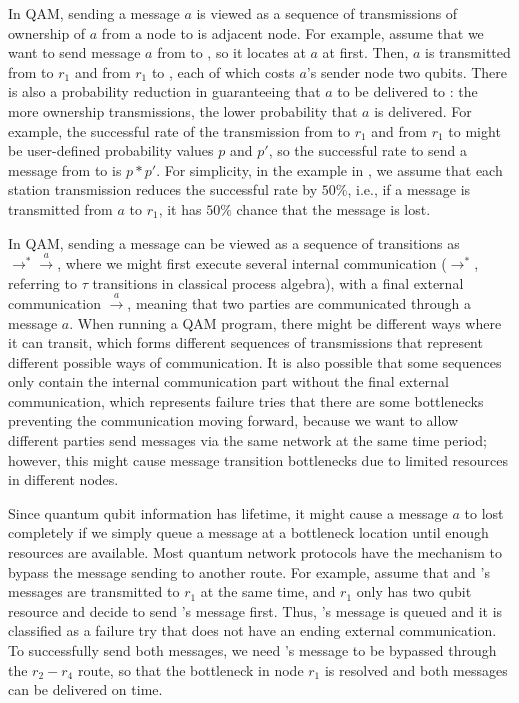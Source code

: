 In QAM, sending a message $a$ is viewed as a sequence of transmissions of ownership of $a$ from a node to is adjacent node.
For example, assume that we want to send message $a$ from  to , so it locates at $a$ at first.
Then, $a$ is transmitted from  to $r_1$ and from $r_1$ to , each of which costs $a$'s sender node two qubits.
There is also a probability reduction in guaranteeing that $a$ to be delivered to :
the more ownership transmissions, the lower probability that $a$ is delivered.
For example, the successful rate of the transmission from  to $r_1$ and from $r_1$ to  might be user-defined probability values $p$ and $p'$, so the successful rate to send a message from  to  is $p * p'$.
For simplicity, in the example in , we assume that each station transmission reduces the successful rate by $50\%$,
i.e., if a message is transmitted from $a$ to $r_1$, it has $50\%$ chance that the message is lost.

In QAM, sending a message can be viewed as a sequence of transitions as $\to^{*}\xrightarrow{a}$,
where we might first execute several internal communication ($\to^{*}$, referring to $\tau$ transitions in classical process algebra),
with a final external communication $\xrightarrow{a}$, meaning that two parties are communicated through a message $a$.
When running a QAM program, there might be different ways where it can transit, which forms different sequences of transmissions that represent different possible ways of communication. It is also possible that some sequences only contain the internal communication part without the final external communication, which represents failure tries that there are some bottlenecks preventing the communication moving forward, because we want to allow different parties send messages via the same network at the same time period; however, this might cause message transition bottlenecks due to limited resources in different nodes.

Since quantum qubit information has lifetime, it might cause a message $a$ to lost completely if we simply queue a message at a bottleneck location until enough resources are available. Most quantum network protocols have the mechanism to bypass the message sending to another route. For example, assume that  and 's messages are transmitted to $r_1$ at the same time, and $r_1$ only has two qubit resource and decide to send 's message first. Thus, 's message is queued and it is classified as a failure try that does not have an ending external communication. To successfully send both messages, we need 's message to be bypassed through the $r_2 - r_4$ route, so that the bottleneck in node $r_1$ is resolved and both messages can be delivered on time.

